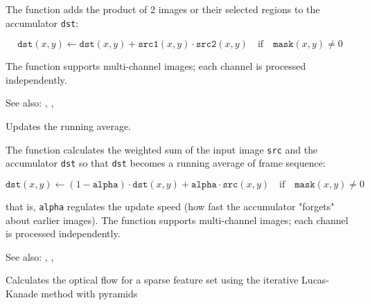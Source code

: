 The function adds the product of 2 images or their selected regions to the accumulator \texttt{dst}:

\[ \texttt{dst}(x,y) \leftarrow \texttt{dst}(x,y) + \texttt{src1}(x,y) \cdot \texttt{src2}(x,y) \quad \text{if} \quad \texttt{mask}(x,y) \ne 0 \]

The function supports multi-channel images; each channel is processed independently.

See also: , , 

Updates the running average.

\begin{description}
\end{description}

The function calculates the weighted sum of the input image
\texttt{src} and the accumulator \texttt{dst} so that \texttt{dst}
becomes a running average of frame sequence:

\[ \texttt{dst}(x,y) \leftarrow (1-\texttt{alpha}) \cdot \texttt{dst}(x,y) + \texttt{alpha} \cdot \texttt{src}(x,y) \quad \text{if} \quad \texttt{mask}(x,y) \ne 0 \]

that is, \texttt{alpha} regulates the update speed (how fast the accumulator "forgets" about earlier images).
The function supports multi-channel images; each channel is processed independently.

See also: , , 

Calculates the optical flow for a sparse feature set using the iterative Lucas-Kanade method with pyramids

